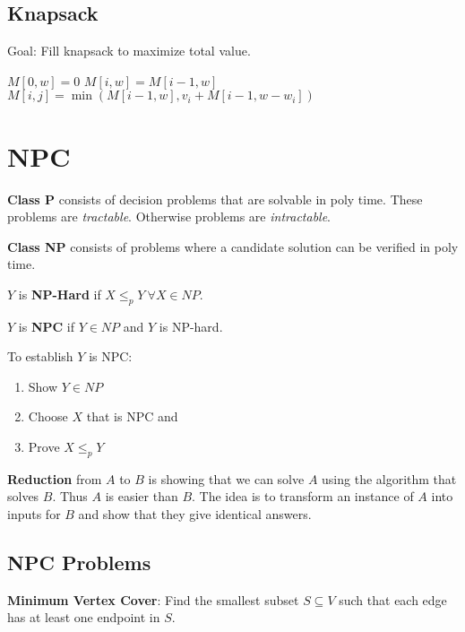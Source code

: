 \subsection*{Knapsack}
Goal: Fill knapsack to maximize total value. 

\begin{algorithm}[H]
\begin{algorithmic}[1]
 $M[0,w] = 0$
\EndFor
{}
\State $M[i,w] = M[i-1,w]$
\Else
\State $M[i,j] = \min(M[i-1,w], v_i + M[i-1,w-w_i])$
\EndIf
\EndFor
\EndFor
\State {} 
\EndProcedure
\end{algorithmic}
\end{algorithm}

\section*{NPC}
\textbf{Class P} consists of decision problems that are solvable in poly time. 
These problems are \textit{tractable}.
Otherwise problems are \textit{intractable}.

\textbf{Class NP} consists of problems where a candidate solution can be verified in poly time. 

$Y$ is \textbf{NP-Hard} if $X \leq_p Y\ \forall X \in NP$.

$Y$ is \textbf{NPC} if $Y \in NP$ and $Y$ is NP-hard. 

To establish $Y$ is NPC:
\begin{enumerate}
\item Show $Y \in NP$
\item Choose $X$ that is NPC and 
\item Prove $X \leq_p Y$	
\end{enumerate}


\textbf{Reduction} from $A$ to $B$ is showing that we can solve $A$ using the algorithm that solves $B$. 
Thus $A$ is easier than $B$. 
The idea is to transform an instance of $A$ into inputs for $B$ and show that they give identical answers. 

\subsection*{NPC Problems}
\textbf{Minimum Vertex Cover}: Find the smallest subset $S \subseteq V$ such that each edge has at least one endpoint in $S$. 

